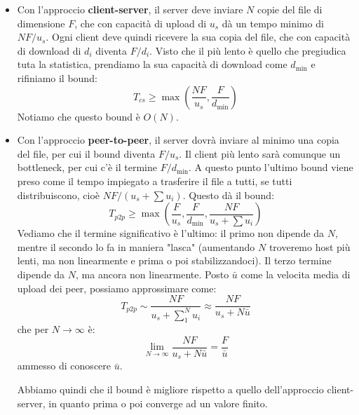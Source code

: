 \documentclass[a4paper,11pt]{article}
\begin{document}
\begin{itemize}
	\item Con l'approccio \textbf{client-server}, il server deve inviare $N$ copie del file di dimensione $F$, che con capacità di upload di $u_s$ dà un tempo minimo di $NF / u_s$.
		Ogni client deve quindi ricevere la sua copia del file, che con capacità di download di $d_i$ diventa $F / d_i$. Visto che il più lento è quello che pregiudica tuta la statistica, prendiamo la sua capacità di download come $d_\text{min}$ e rifiniamo il bound:
		$$
			T_{cs} \geq \max\left( \frac{NF}{u_s}, \frac{F}{d_\text{min}} \right)
		$$
		Notiamo che questo bound è $O(N)$.
	\item Con l'approccio \textbf{peer-to-peer}, il server dovrà inviare al minimo una copia del file, per cui il bound diventa $F / u_s$. Il client più lento sarà comunque un bottleneck, per cui c'è il termine $F / d_\text{min}$. A questo punto l'ultimo bound viene preso come il tempo impiegato a trasferire il file a tutti, se tutti distribuiscono, cioè $NF / (u_s + \sum u_i)$. Questo dà il bound:
		$$
		T_{p2p} \geq \max\left( \frac{F}{u_s}, \frac{F}{d_\text{min}}, \frac{NF}{u_s + \sum u_i} \right)
		$$
		Vediamo che il termine significativo è l'ultimo: il primo non dipende da $N$, mentre il secondo lo fa in maniera "lasca" (aumentando $N$ troveremo host più lenti, ma non linearmente e prima o poi stabilizzandoci).
		Il terzo termine dipende da $N$, ma ancora non linearmente.
		Posto $\bar{u}$ come la velocita media di upload dei peer, possiamo approssimare come:
		$$
		T_{p2p} \sim \frac{NF}{u_s + \sum_1^N u_i} \approx \frac{NF}{u_s + N \bar{u}}
		$$
		che per $N\rightarrow\infty$ è:
		$$
		\lim_{N\rightarrow \infty} \frac{NF}{u_s + N \bar{u}} = \frac{F}{\bar{u}}
		$$
		ammesso di conoscere $\bar{u}$.

		Abbiamo quindi che il bound è migliore rispetto a quello dell'approccio client-server, in quanto prima o poi converge ad un valore finito. 

\end{itemize}
\end{document}
